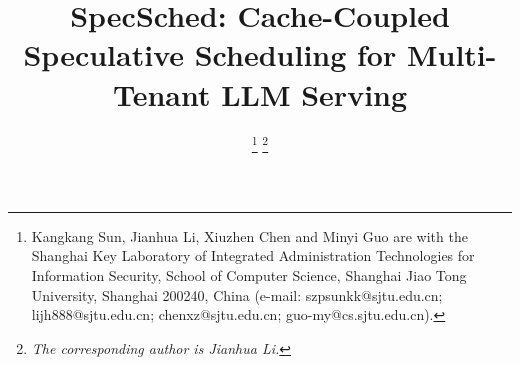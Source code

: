\documentclass[journal]{IEEEtran}
\begin{document}
\title{SpecSched: Cache-Coupled Speculative Scheduling for Multi-Tenant LLM Serving}

\author{
\thanks{Kangkang Sun, Jianhua Li, Xiuzhen Chen and Minyi Guo are
with the Shanghai Key Laboratory of Integrated Administration Technologies for Information Security, School of Computer Science, Shanghai Jiao Tong University, Shanghai 200240, China (e-mail: szpsunkk@sjtu.edu.cn; lijh888@sjtu.edu.cn; chenxz@sjtu.edu.cn; guo-my@cs.sjtu.edu.cn).}
\thanks{\textit{The corresponding author is Jianhua Li.}}

}

\maketitle
\end{document}
